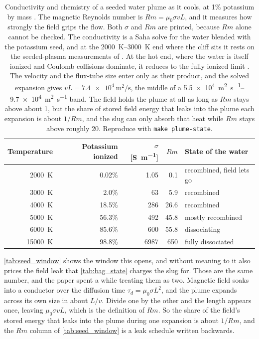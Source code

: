 \documentclass{article}
\begin{document}
\begin{table}[!htpb]
    \centering
    \caption{Conductivity and chemistry of a seeded water plume as it cools, at 1\% potassium by mass \cite{Katz_puffsat_impact_sim_2026}. The magnetic Reynolds number is $Rm = \mu_0 \sigma v L$, and it measures how strongly the field grips the flow. Both $\sigma$ and $Rm$ are printed, because $Rm$ alone cannot be checked. The conductivity is a Saha solve for the water \cite{hansen_kawaler_trimble_stellar_interiors} blended with the potassium seed, and at the \SIrange{2000}{3000}{\kelvin} end where the cliff sits it rests on the seeded-plasma measurements of \cite{kerrebrock1964nonequilibrium,rosa1968mhd,messerle1995mhd}. At the hot end, where the water is itself ionized and Coulomb collisions dominate, it reduces to the fully ionized limit \cite{spitzer1962fullyionized}. The velocity and the flux-tube size enter only as their product, and the solved expansion gives $vL = \SI{7.4e4}{\square\meter\per\second}$, the middle of a \SIrange{5.5e4}{9.7e4}{\square\meter\per\second} band. The field holds the plume at all as long as $Rm$ stays above about 1, but the share of stored field energy that leaks into the plume each expansion is about $1/Rm$, and the slug can only absorb that heat while $Rm$ stays above roughly 20. Reproduce with \texttt{make plume-state}.}
    \label{tab:seed_window}
    \begin{tabular}{|r|r|r|r|l|}\hline
        \textbf{Temperature} & \textbf{Potassium ionized} & \textbf{$\sigma$ [\si{\siemens\per\meter}]} & \textbf{$Rm$} & \textbf{State of the water} \\\hline
        \SI{2000}{\kelvin} & 0.02\% & 1.05 & 0.1 & recombined, field lets go \\\hline
        \SI{3000}{\kelvin} & 2.0\% & 63 & 5.9 & recombined \\\hline
        \SI{4000}{\kelvin} & 18.5\% & 286 & 26.6 & recombined \\\hline
        \SI{5000}{\kelvin} & 56.3\% & 492 & 45.8 & mostly recombined \\\hline
        \SI{6000}{\kelvin} & 85.6\% & 600 & 55.8 & dissociating \\\hline
        \SI{15000}{\kelvin} & 98.8\% & \num{6987} & 650 & fully dissociated \\\hline
    \end{tabular}
\end{table}

\autoref{tab:seed_window} shows the window this opens, and without meaning to it also prices the field leak that \autoref{tab:bag_state} charges the slug for. Those are the same number, and the paper spent a while treating them as two. Magnetic field soaks into a conductor over the diffusion time $\tau_d = \mu_0 \sigma L^2$, and the plume expands across its own size in about $L/v$. Divide one by the other and the length appears once, leaving $\mu_0 \sigma v L$, which is the definition of $Rm$. So the share of the field's stored energy that leaks into the plume during one expansion is about $1/Rm$, and the $Rm$ column of \autoref{tab:seed_window} is a leak schedule written backwards.
\end{document}
